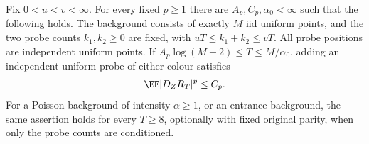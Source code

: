 \documentclass[11pt,letterpaper]{article}
\begin{document}
\begin{lemma}
\label{lem:two-count-reservoirs}
Fix $0<u<v<\infty$. For every fixed $p\ge1$ there are
$A_p,C_p,\alpha_0<\infty$ such that the following holds.
The background consists of exactly $M$ iid uniform points,
and the two probe counts $k_1,k_2\ge0$ are fixed, with
$uT\le k_1+k_2\le vT$. All probe positions are independent
uniform points. If $A_p\log(M+2)\le T\le M/\alpha_0$,
adding an independent uniform probe of either colour satisfies
\begin{equation}\label{eq:fixed-count-local-increment}
 \EE|D_ZR_T|^p\le C_p.
\end{equation}
For a Poisson background of intensity $\alpha\ge1$, or an
entrance background, the same assertion holds for every
$T\ge8$, optionally with fixed original parity, when only
the probe counts are conditioned.
\end{lemma}
\end{document}
